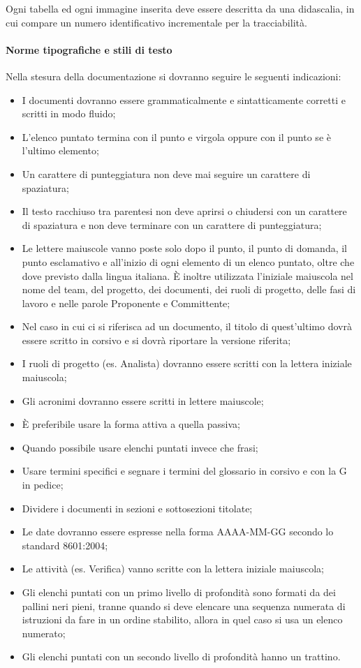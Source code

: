 Ogni tabella ed ogni immagine inserita deve essere descritta da una didascalia, in cui compare un numero identificativo incrementale per la tracciabilità.

\paragraph{Norme tipografiche e stili di testo}
\label{5.4}
Nella stesura della documentazione si dovranno seguire le seguenti indicazioni:
\begin{itemize}
\item I documenti dovranno essere grammaticalmente e sintatticamente corretti e scritti in modo fluido;
\item L'elenco puntato termina con il punto e virgola oppure con il punto se è l'ultimo elemento;
\item Un carattere di punteggiatura non deve mai seguire un carattere di spaziatura;
\item Il testo racchiuso tra parentesi non deve aprirsi o chiudersi con un carattere di spaziatura e non deve terminare con un carattere di punteggiatura;
\item Le lettere maiuscole vanno poste solo dopo il punto, il punto di domanda, il punto esclamativo e all'inizio di ogni elemento di un elenco puntato, oltre che dove previsto dalla lingua italiana. È inoltre utilizzata l'iniziale maiuscola nel nome del team, del progetto, dei documenti, dei ruoli di progetto, delle fasi di lavoro e nelle parole Proponente e Committente;
\item Nel caso in cui ci si riferisca ad un documento, il titolo di quest'ultimo dovrà essere scritto in corsivo e si dovrà riportare la versione riferita;
\item I ruoli di progetto (es. Analista) dovranno essere scritti con la lettera iniziale maiuscola;
\item Gli acronimi dovranno essere scritti in lettere maiuscole;
\item \`{E} preferibile usare la forma attiva a quella passiva;
\item Quando possibile usare elenchi puntati invece che frasi;
\item Usare termini specifici e segnare i termini del glossario in corsivo e con la G in pedice;
\item Dividere i documenti in sezioni e sottosezioni titolate;
\item Le date dovranno essere espresse nella forma AAAA-MM-GG secondo lo standard  8601:2004;
\item Le attività (es. Verifica) vanno scritte con la lettera iniziale maiuscola;
\item Gli elenchi puntati con un primo livello di profondità sono formati da dei pallini neri pieni, tranne quando si deve elencare una sequenza numerata di istruzioni da fare in un ordine stabilito, allora in quel caso si usa un elenco numerato;
\item Gli elenchi puntati con un secondo livello di profondità hanno un trattino.
\end{itemize}

